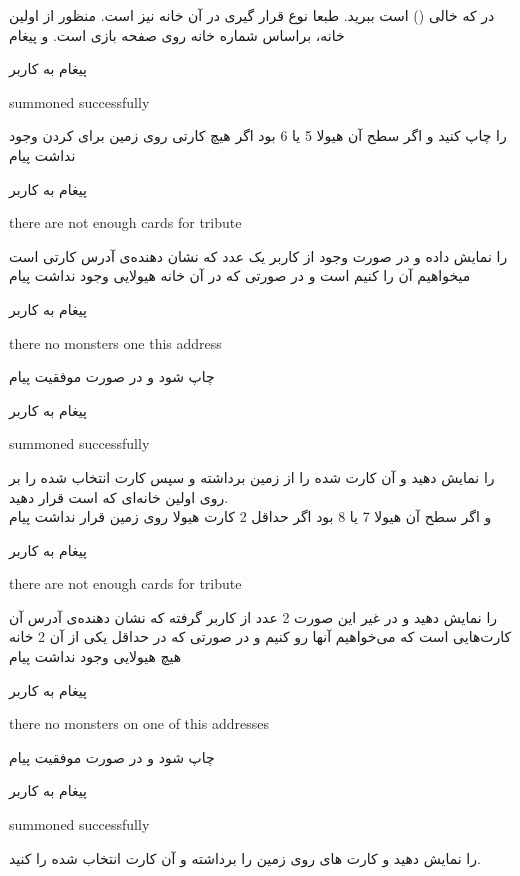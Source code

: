 \documentclass[]{article}
\begin{document}
در 
 که خالی () است ببرید. طبعا نوع قرار گیری در 
آن خانه نیز  است. منظور از اولین خانه، براساس شماره خانه روی صفحه 
بازی است. و پیغام 
\begin{mybox}[colback=yellow]{پیغام به کاربر}
	\begin{latin}	
		summoned successfully
	\end{latin}
\end{mybox}
را چاپ کنید و اگر سطح آن هیولا 5 یا 6 بود اگر هیچ کارتی روی زمین برای 
 کردن وجود نداشت پیام
\begin{mybox}[colback=yellow]{پیغام به کاربر}
	\begin{latin}	
		there are not enough cards for tribute
	\end{latin}
\end{mybox}
را نمایش داده و در صورت وجود از کاربر یک عدد که نشان دهنده‌ی آدرس کارتی است 
میخواهیم آن را  کنیم است و در صورتی که در آن خانه هیولایی وجود 
نداشت پیام
\begin{mybox}[colback=yellow]{پیغام به کاربر}
	\begin{latin}	
		there no monsters one this address		
	\end{latin}
\end{mybox}
چاپ شود و در صورت موفقیت پیام
\begin{mybox}[colback=yellow]{پیغام به کاربر}
	\begin{latin}	
		summoned successfully 
	\end{latin}
\end{mybox}
را نمایش دهید و آن کارت  شده را از زمین برداشته و سپس کارت 
انتخاب شده را بر روی اولین خانه‌ای که  است قرار دهید.
\\
و اگر سطح آن هیولا 7 یا 8 بود اگر حداقل 2 کارت هیولا روی زمین قرار نداشت پیام
\begin{mybox}[colback=yellow]{پیغام به کاربر}
	\begin{latin}	
		there are not enough cards for tribute
	\end{latin}
\end{mybox}
را نمایش دهید و در غیر این صورت 2 عدد از کاربر گرفته که نشان دهنده‌ی آدرس آن 
کارت‌هایی است که می‌خواهیم آنها رو  کنیم و در صورتی که در حداقل 
یکی از آن 2 خانه هیچ هیولایی وجود نداشت پیام
\begin{mybox}[colback=yellow]{پیغام به کاربر}
	\begin{latin}	
		there no monsters on one of this addresses
	\end{latin}
\end{mybox}
چاپ شود و در صورت موفقیت پیام
\begin{mybox}[colback=yellow]{پیغام به کاربر}
	\begin{latin}	
		summoned successfully
	\end{latin}
\end{mybox}
را نمایش دهید و کارت های روی زمین را برداشته و آن کارت انتخاب شده را 
 کنید.
\end{document}
